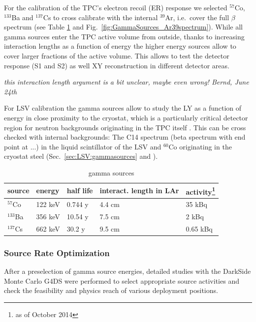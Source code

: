 For the calibration of the TPC's electron recoil (ER) response we selected $^{57}$Co, $^{133}$Ba and $^{137}$Cs to cross calibrate with the internal $^{39}$Ar, i.e.~cover the full $\beta$ spectrum (see Table \ref{tbl:GammaSources} and Fig.~\ref{fig:GammaSources_Ar39spectrum}). While all gamma sources enter the TPC active volume from outside, thanks to increasing interaction lengths as a function of energy the higher energy sources allow to cover larger fractions of the active volume. This allows to test the detector response (S1 and S2) as well XY reconstruction in different detector areas. 

\textit{this interaction length argument is a bit unclear, maybe even wrong! Bernd, June 24th}


For LSV calibration the gamma sources allow to study the LY as a function of energy in close proximity to the cryostat, which is a particularly critical detector region for neutron backgrounds originating in the TPC itself \cite{wright}. This can be cross checked with internal backgrounds: The C14 spectrum (beta spectrum with end point at ...) in the liquid scintillator of the LSV and $^{60}$Co originating in the cryostat steel (Sec.~\ref{sec:LSV:gammasources} and \cite{DS50:veto:paper}).

\begin{table}[htbp]
\caption{gamma sources}
\begin{tabular}{|l|l|l|l|l|}
\hline
\textbf{source} & \textbf{energy} & \textbf{half life} & \textbf{interact. length in LAr} & \textbf{activity}\footnote{as of October 2014} \\ \hline
$^{57}$Co & 122 keV & 0.744 y & 4.4 cm & 35 kBq \\ \hline
$^{133}$Ba & 356 keV & 10.54 y & 7.5 cm & 2 kBq \\ \hline
$^{137}$Cs & 662 keV & 30.2 y & 9.5 cm & 0.65 kBq \\ \hline
\end{tabular}
\label{tbl:GammaSources}
\end{table}

\subsubsection{Source Rate Optimization}
After a preselection of gamma source energies, detailed studies with the DarkSide Monte Carlo G4DS were performed to select appropriate source activities and check the feasibility and physics reach of various deployment positions.


